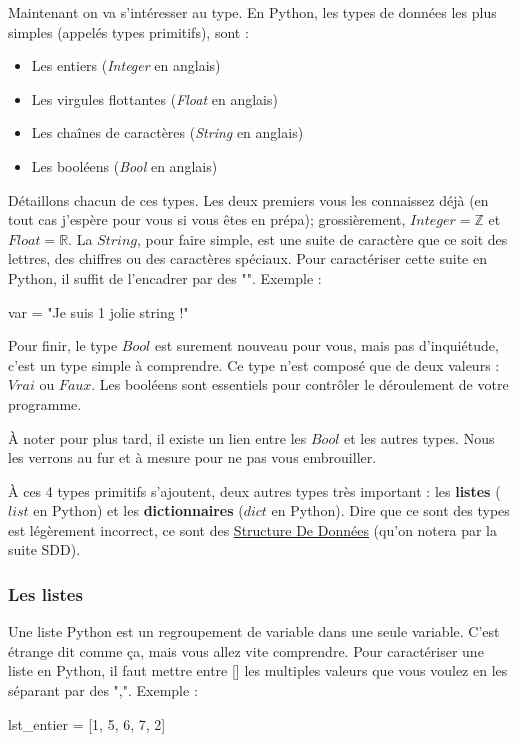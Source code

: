 \documentclass[a4paper,12pt]{article}
\begin{document}
Maintenant on va s'intéresser au type. En Python, les types de données les plus simples (appelés types primitifs), sont : 
\begin{itemize}
    \item Les entiers (\textit{Integer} en anglais)
    \item Les virgules flottantes (\textit{Float} en anglais)
    \item Les chaînes de caractères (\textit{String} en anglais)
    \item Les booléens (\textit{Bool} en anglais)
\end{itemize}

Détaillons chacun de ces types. Les deux premiers vous les connaissez déjà (en tout cas j'espère pour vous si vous êtes en prépa); grossièrement, $Integer = \mathbb{Z}$ et
$Float = \mathbb{R}$.
La $String$, pour faire simple, est une suite de caractère que ce soit des lettres, des chiffres ou des caractères spéciaux.
Pour caractériser cette suite en Python, il suffit de l'encadrer par des "". Exemple : 
\begin{pythoncode}
    var = "Je suis 1 jolie string !"
\end{pythoncode}
Pour finir, le type $Bool$ est surement nouveau pour vous, mais pas d'inquiétude, c'est un type simple à comprendre. Ce type n'est composé que de deux valeurs :
$Vrai$ ou $Faux$. Les booléens sont essentiels pour contrôler le déroulement de votre programme.

{\color{cyan}
\vspace{1.0em}
À noter pour plus tard, il existe un lien entre les $Bool$ et les autres types. Nous les verrons au fur et à mesure pour ne pas vous embrouiller. \newline
}

À ces 4 types primitifs s'ajoutent, deux autres types très important : les \textbf{listes} ($list$ en Python) et les \textbf{dictionnaires} ($dict$ en Python).
Dire que ce sont des types est légèrement incorrect, ce sont des \underline{Structure De Données} (qu'on notera par la suite SDD).

\subsubsection{Les listes}

Une liste Python est un regroupement de variable dans une seule variable. C'est étrange dit comme ça, mais vous allez vite comprendre. 
Pour caractériser une liste en Python, il faut mettre entre [] les multiples valeurs que vous voulez en les séparant par des ",". Exemple : 
\begin{pythoncode}
    lst_entier = [1, 5, 6, 7, 2]
\end{pythoncode}
\end{document}
